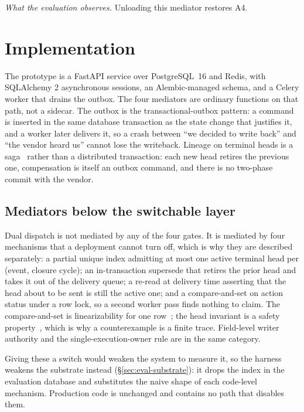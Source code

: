 \documentclass[acmsmall,manuscript,review,anonymous]{acmart}
\renewcommand{\_}{\discretionary{\textunderscore}{}{\textunderscore}}
\begin{document}
\emph{What the evaluation observes.} Unloading this mediator restores A4.

\section{Implementation}
\label{sec:impl}

The prototype is a FastAPI service over PostgreSQL~16 and Redis, with SQLAlchemy
2 asynchronous sessions, an Alembic-managed schema, and a Celery worker that
drains the outbox. The four mediators are ordinary functions on that path, not
a sidecar. The outbox is the transactional-outbox pattern: a command is inserted
in the same database transaction as the state change that justifies it, and a
worker later delivers it, so a crash between ``we decided to write back'' and
``the vendor heard us'' cannot lose the writeback. Lineage on
terminal heads is a saga~\cite{garciamolina1987sagas} rather than a distributed
transaction: each new head retires the previous one, compensation is itself an
outbox command, and there is no two-phase commit with the vendor.

\subsection{Mediators below the switchable layer}
\label{sec:impl-nonswitch}

Dual dispatch is not mediated by any of the four gates. It is mediated by four
mechanisms that a deployment cannot turn off, which is why they are described
separately: a partial unique index admitting at most one active terminal head per
(event, closure cycle); an in-transaction supersede that retires the prior head
and takes it out of the delivery queue; a re-read at delivery time asserting that
the head about to be sent is still the active one; and a compare-and-set on
action status under a row lock, so a second worker pass finds nothing to claim.
The compare-and-set is linearizability for one
row~\cite{herlihy1990linearizability}; the head invariant is a safety
property~\cite{alpern1989defining}, which is why a counterexample is a finite
trace. Field-level writer authority and the single-execution-owner rule are in
the same category.

Giving these a switch would weaken the system to measure it, so the harness
weakens the substrate instead (\S\ref{sec:eval-substrate}): it drops the index in
the evaluation database and substitutes the naive shape of each code-level
mechanism. Production code is unchanged and contains no path that disables them.
\end{document}
